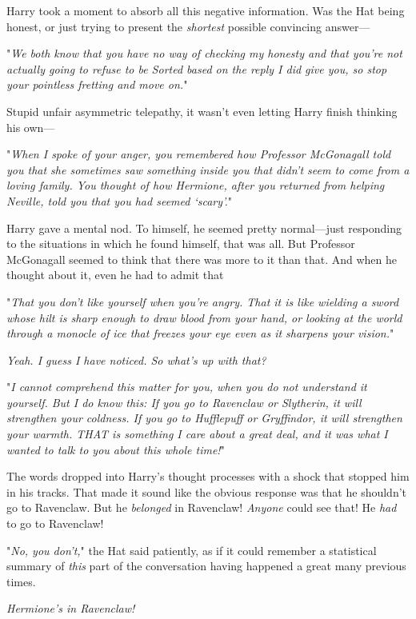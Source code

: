 Harry took a moment to absorb all this negative information. Was the Hat being
honest, or just trying to present the \emph{shortest} possible convincing
answer---

"\emph{We both know that you have no way of checking my honesty and that you're
not actually going to refuse to be Sorted based on the reply I did give you, so
stop your pointless fretting and move on.}"

Stupid unfair asymmetric telepathy, it wasn't even letting Harry finish
thinking his own---

"\emph{When I spoke of your anger, you remembered how Professor McGonagall told
you that she sometimes saw something inside you that didn't seem to come from a
loving family. You thought of how Hermione, after you returned from helping
Neville, told you that you had seemed `scary'.}"

Harry gave a mental nod. To himself, he seemed pretty normal---just responding
to the situations in which he found himself, that was all. But Professor
McGonagall seemed to think that there was more to it than that. And when he
thought about it, even he had to admit that{\el}

"\emph{That you don't like yourself when you're angry. That it is like wielding
a sword whose hilt is sharp enough to draw blood from your hand, or looking at
the world through a monocle of ice that freezes your eye even as it sharpens
your vision.}"

\emph{Yeah. I guess I have noticed. So what's up with that?}

"\emph{I cannot comprehend this matter for you, when you do not understand it
yourself. But I do know this: If you go to Ravenclaw or Slytherin, it will
strengthen your coldness. If you go to Hufflepuff or Gryffindor, it will
strengthen your warmth. THAT is something I care about a great deal, and it was
what I wanted to talk to you about this whole time!}"

The words dropped into Harry's thought processes with a shock that stopped him
in his tracks. That made it sound like the obvious response was that he
shouldn't go to Ravenclaw. But he \emph{belonged} in Ravenclaw! \emph{Anyone}
could see that! He \emph{had} to go to Ravenclaw!

"\emph{No, you don't,}" the Hat said patiently, as if it could remember a
statistical summary of \emph{this} part of the conversation having happened a
great many previous times.

\emph{Hermione's in Ravenclaw!}

